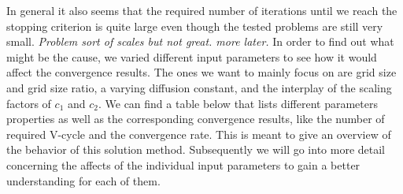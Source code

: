 \documentclass[../draft_1.tex]{subfiles}
\begin{document}
In general it also seems that the required number of iterations until we reach the stopping criterion is quite large even though the tested problems are still very small. \textit{Problem sort of scales but not great. more later.} In order to find out what might be the cause, we varied different input parameters to see how it would affect the convergence results. The ones we want to mainly focus on are grid size and grid size ratio, a varying diffusion constant, and the interplay of the scaling factors of $c_1$ and $c_2$. We can find a table below that lists different parameters properties as well as the corresponding convergence results, like the number of required V-cycle and the convergence rate. This is meant to give an overview of the behavior of this solution method. Subsequently we will go into more detail concerning the affects of the individual input parameters to gain a better understanding for each of them. 
\end{document}
